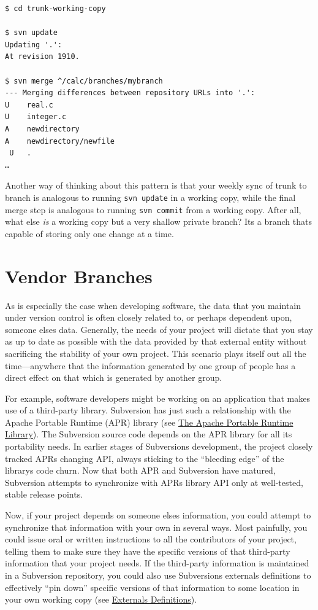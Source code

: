 \begin{verbatim}
$ cd trunk-working-copy

$ svn update
Updating '.':
At revision 1910.

$ svn merge ^/calc/branches/mybranch
--- Merging differences between repository URLs into '.':
U    real.c
U    integer.c
A    newdirectory
A    newdirectory/newfile
 U   .
…
\end{verbatim}

Another way of thinking about this pattern is that your weekly sync of
trunk to branch is analogous to running \texttt{svn\ update} in a
working copy, while the final merge step is analogous to running
\texttt{svn\ commit} from a working copy. After all, what else \emph{is}
a working copy but a very shallow private branch? It\textquotesingle s a
branch that\textquotesingle s capable of storing only one change at a
time.

\section{Vendor Branches}\label{svn.advanced.vendorbr}

As is especially the case when developing software, the data that you
maintain under version control is often closely related to, or perhaps
dependent upon, someone else\textquotesingle s data. Generally, the
needs of your project will dictate that you stay as up to date as
possible with the data provided by that external entity without
sacrificing the stability of your own project. This scenario plays
itself out all the time---anywhere that the information generated by one
group of people has a direct effect on that which is generated by
another group.

For example, software developers might be working on an application that
makes use of a third-party library. Subversion has just such a
relationship with the Apache Portable Runtime (APR) library (see
\hyperref[svn.developer.usingapi.apr]{The Apache Portable Runtime
Library}). The Subversion source code depends on the APR library for all
its portability needs. In earlier stages of Subversion\textquotesingle s
development, the project closely tracked APR\textquotesingle s changing
API, always sticking to the ``bleeding edge'' of the
library\textquotesingle s code churn. Now that both APR and Subversion
have matured, Subversion attempts to synchronize with
APR\textquotesingle s library API only at well-tested, stable release
points.

Now, if your project depends on someone else\textquotesingle s
information, you could attempt to synchronize that information with your
own in several ways. Most painfully, you could issue oral or written
instructions to all the contributors of your project, telling them to
make sure they have the specific versions of that third-party
information that your project needs. If the third-party information is
maintained in a Subversion repository, you could also use
Subversion\textquotesingle s externals definitions to effectively ``pin
down'' specific versions of that information to some location in your
own working copy (see \hyperref[svn.advanced.externals]{Externals
Definitions}).

